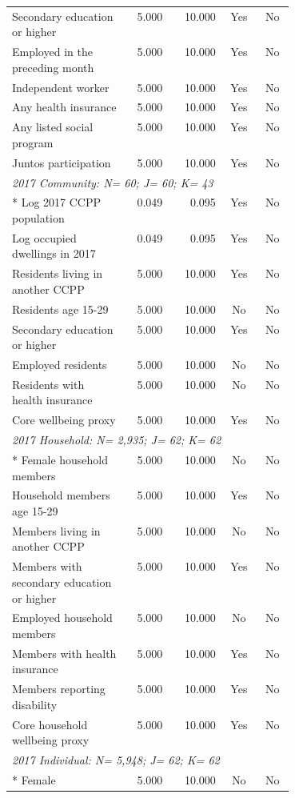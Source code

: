 \begin{longtable}{@{}p{0.41\linewidth}rrcc@{}}
Secondary education or higher &  5.000 & 10.000 & Yes & No \\
Employed in the preceding month &  5.000 & 10.000 & Yes & No \\
Independent worker &  5.000 & 10.000 & Yes & No \\
Any health insurance &  5.000 & 10.000 & Yes & No \\
Any listed social program &  5.000 & 10.000 & Yes & No \\
Juntos participation &  5.000 & 10.000 & Yes & No \\
\multicolumn{5}{l}{\textit{2017 Community: N=       60; J=       60; K=       43}}\\*
Log 2017 CCPP population &  0.049 &  0.095 & Yes & No \\
Log occupied dwellings in 2017 &  0.049 &  0.095 & Yes & No \\
Residents living in another CCPP &  5.000 & 10.000 & Yes & No \\
Residents age 15-29 &  5.000 & 10.000 & No & No \\
Secondary education or higher &  5.000 & 10.000 & Yes & No \\
Employed residents &  5.000 & 10.000 & No & No \\
Residents with health insurance &  5.000 & 10.000 & No & No \\
Core wellbeing proxy &  5.000 & 10.000 & Yes & No \\
\multicolumn{5}{l}{\textit{2017 Household: N=    2,935; J=       62; K=       62}}\\*
Female household members &  5.000 & 10.000 & No & No \\
Household members age 15-29 &  5.000 & 10.000 & Yes & No \\
Members living in another CCPP &  5.000 & 10.000 & No & No \\
Members with secondary education or higher &  5.000 & 10.000 & Yes & No \\
Employed household members &  5.000 & 10.000 & No & No \\
Members with health insurance &  5.000 & 10.000 & Yes & No \\
Members reporting disability &  5.000 & 10.000 & Yes & No \\
Core household wellbeing proxy &  5.000 & 10.000 & Yes & No \\
\multicolumn{5}{l}{\textit{2017 Individual: N=    5,948; J=       62; K=       62}}\\*
Female &  5.000 & 10.000 & No & No \\

\end{longtable}
